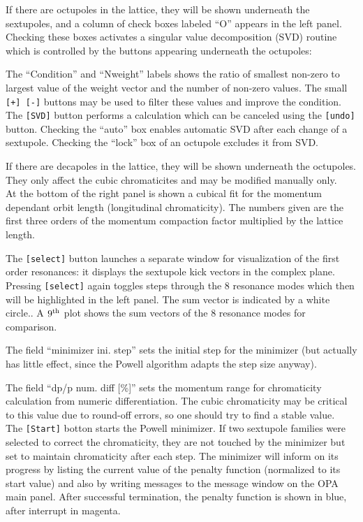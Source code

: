 \documentclass[12pt]{article}
\begin{document}
If there are octupoles in the lattice, they will be shown underneath the sextupoles, and a column of check boxes labeled ``O'' appears in the left panel. 
Checking these boxes activates
a singular value decomposition (SVD) routine which is controlled
by the buttons appearing underneath the octupoles:

The ``Condition'' and ``Nweight''
labels shows the ratio of smallest non-zero to largest value of the weight vector
and the number of non-zero values. The small {\tt [+] [-]}  buttons may be used to filter these values and improve the condition. 
The {\tt [SVD]} button performs a calculation which
can be canceled using the {\tt [undo]} button. 
Checking the ``auto'' box enables automatic SVD after each change of a sextupole. Checking the ``lock'' box of an octupole excludes it from SVD.

If there are decapoles in the lattice, they will be shown underneath the octupoles. They only affect the cubic chromaticites and may be modified manually only.\\

At the bottom of the right panel is shown a
cubical fit for the momentum dependant orbit length (longitudinal chromaticity). The numbers given are the first three orders of the momentum
compaction factor multiplied by the lattice length.

The {\tt [select]} button launches a separate window for visualization of the first order resonances: it displays the sextupole kick vectors in the complex plane. Pressing {\tt [select]} again toggles steps through the 8 resonance modes which then will be highlighted in the left panel. The sum vector is indicated by a white circle.. A $9^{\rm th}$ plot shows the sum vectors of the 8 resonance modes for comparison.

The field ``minimizer ini. step'' sets the initial step for the minimizer (but actually has little effect, since the Powell algorithm adapts the step size anyway).

The field ``dp/p num. diff [\%]'' sets the momentum range for chromaticity calculation from numeric differentiation. The cubic chromaticity may be critical to this value due to round-off errors, so one should try to find a stable value.\\

The {\tt [Start]} botton starts the Powell minimizer.
If two sextupole families were selected to correct the chromaticity, they are not touched by the minimizer but set to maintain chromaticity after each step.
The minimizer will inform on its progress by listing the current
value of the penalty function (normalized to its start value) and
also by writing messages to the message window on the OPA main panel.
After successful termination, the penalty function is shown in blue, after
interrupt in magenta.
\end{document}
